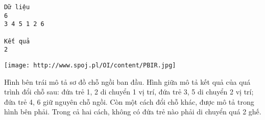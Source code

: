 \begin{verbatim}
Dữ liệu
6
3 4 5 1 2 6

Kết quả
2
\end{verbatim}
\texttt{[image: http://www.spoj.pl/OI/content/PBIR.jpg]}

   Hình bên trái mô tả sơ đồ chỗ ngồi ban đầu. Hình giữa mô tả kết quả của quá trình đổi chỗ sau: đứa trẻ 1, 2 di chuyển 1 vị trí, đứa trẻ 3, 5 di chuyển 2 vị trí; đứa trẻ 4, 6 giữ nguyên chỗ ngồi. Còn một cách đổi chỗ khác, được mô tả trong hình bên phải. Trong cả hai cách, không có đứa trẻ nào phải di chuyển quá 2 ghế.
